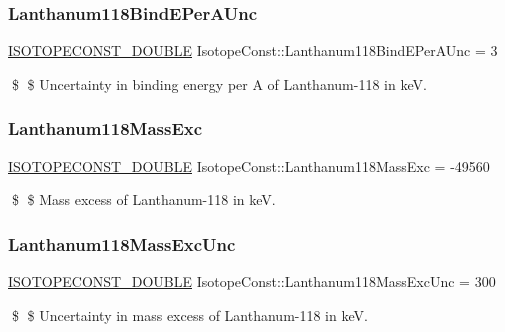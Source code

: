 \subsubsection{\texorpdfstring{Lanthanum118\+Bind\+E\+Per\+A\+Unc}{Lanthanum118BindEPerAUnc}}
{\footnotesize\ttfamily \mbox{\hyperlink{group___isotope_const-_macros_ga8f45a7272ce02c0b4c65c44636ed719a}{I\+S\+O\+T\+O\+P\+E\+C\+O\+N\+S\+T\+\_\+\+D\+O\+U\+B\+LE}} Isotope\+Const\+::\+Lanthanum118\+Bind\+E\+Per\+A\+Unc = 3}

\$ \$ Uncertainty in binding energy per A of Lanthanum-\/118 in keV. \mbox{\label{group___isotope_const-_lanthanum-_la118_ga648ef2c3284093d61185930274c974f3}} 
\subsubsection{\texorpdfstring{Lanthanum118\+Mass\+Exc}{Lanthanum118MassExc}}
{\footnotesize\ttfamily \mbox{\hyperlink{group___isotope_const-_macros_ga8f45a7272ce02c0b4c65c44636ed719a}{I\+S\+O\+T\+O\+P\+E\+C\+O\+N\+S\+T\+\_\+\+D\+O\+U\+B\+LE}} Isotope\+Const\+::\+Lanthanum118\+Mass\+Exc = -\/49560}

\$ \$ Mass excess of Lanthanum-\/118 in keV. \mbox{\label{group___isotope_const-_lanthanum-_la118_ga24168903f8eff61d0080e5f918a61f63}} 
\subsubsection{\texorpdfstring{Lanthanum118\+Mass\+Exc\+Unc}{Lanthanum118MassExcUnc}}
{\footnotesize\ttfamily \mbox{\hyperlink{group___isotope_const-_macros_ga8f45a7272ce02c0b4c65c44636ed719a}{I\+S\+O\+T\+O\+P\+E\+C\+O\+N\+S\+T\+\_\+\+D\+O\+U\+B\+LE}} Isotope\+Const\+::\+Lanthanum118\+Mass\+Exc\+Unc = 300}

\$ \$ Uncertainty in mass excess of Lanthanum-\/118 in keV. \mbox{\label{group___isotope_const-_lanthanum-_la118_gada9e32b4945f507fb6894013189b8543}} 
